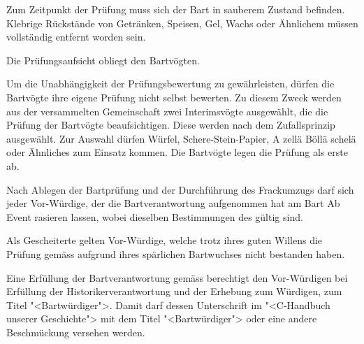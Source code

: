 \documentclass[fontsize=12pt,parskip=half]{scrartcl}
\begin{document}
\begin{contract}
  \SubClause[title={Zustand des Bartes}]
  Zum Zeitpunkt der Prüfung muss sich der Bart in sauberem Zustand befinden. Klebrige Rückstände von Getränken,
  Speisen, Gel, Wachs oder Ähnlichem müssen vollständig entfernt worden sein.

  \SubClause[title={Prüfungsaufsicht}]
  Die Prüfungsaufsicht obliegt den Bartvögten.

  \SubClause[title={Prüfung der Bartvögte}]
  Um die Unabhängigkeit der Prüfungsbewertung zu gewährleisten, dürfen die Bartvögte ihre eigene Prüfung nicht selbst bewerten.
  Zu diesem Zweck werden aus der versammelten Gemeinschaft zwei Interimsvögte ausgewählt, die die Prüfung
  der Bartvögte beaufsichtigen. Diese werden nach dem Zufallsprinzip ausgewählt. Zur Auswahl dürfen Würfel,
  Schere-Stein-Papier, A zellä Böllä schelä oder Ähnliches zum Einsatz kommen. Die Bartvögte legen die
  Prüfung als erste ab.

  \Clause[title={BartAb}]
  Nach Ablegen der Bartprüfung und der Durchführung des Frackumzugs darf sich jeder Vor-Würdige, der die Bartverantwortung aufgenommen
  hat am Bart Ab Event rasieren lassen, wobei dieselben Bestimmungen des  gültig sind.

  \Clause[title={Gescheiterte}]\label{B.gescheiterte}
  Als Gescheiterte gelten Vor-Würdige, welche trotz ihres guten Willens die Prüfung gemäss 
  aufgrund ihres spärlichen Bartwuchses nicht bestanden haben.

  \Clause[title={Titel}]\label{B.barttitel}
  Eine Erfüllung der Bartverantwortung gemäss  berechtigt den Vor-Würdigen bei Erfüllung der Historikerverantwortung 
  und der Erhebung zum Würdigen, zum Titel "<Bartwürdiger">. Damit darf dessen Unterschrift im "<C-Handbuch unserer Geschichte"> mit dem Titel "<Bartwürdiger"> oder eine andere
  Beschmückung versehen werden.

\end{contract}

\pagebreak
\end{document}
